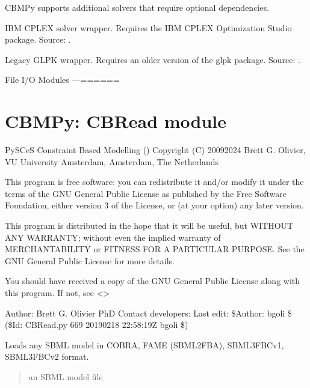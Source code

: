 \documentclass[letterpaper,12pt,english]{sphinxmanual}
\begin{document}
\sphinxAtStartPar
CBMPy supports additional solvers that require optional dependencies.

\sphinxAtStartPar
{} \sphinxhyphen{} IBM CPLEX solver wrapper. Requires the IBM CPLEX Optimization Studio package. Source: .

\sphinxAtStartPar
{} \sphinxhyphen{} Legacy GLPK wrapper. Requires an older version of the glpk package. Source: .

\sphinxstepscope

\sphinxAtStartPar
File I/O Modules
—=\sphinxhyphen{}=\textendash{}=\sphinxhyphen{}=\textendash{}=\sphinxhyphen{}=


\section{CBMPy: CBRead module}
\label{\detokenize{api/io:cbmpy-cbread-module}}\label{\detokenize{api/io::doc}}
\sphinxAtStartPar
PySCeS Constraint Based Modelling ()
Copyright (C) 2009\sphinxhyphen{}2024 Brett G. Olivier, VU University Amsterdam, Amsterdam, The Netherlands

\sphinxAtStartPar
This program is free software: you can redistribute it and/or modify
it under the terms of the GNU General Public License as published by
the Free Software Foundation, either version 3 of the License, or
(at your option) any later version.

\sphinxAtStartPar
This program is distributed in the hope that it will be useful,
but WITHOUT ANY WARRANTY; without even the implied warranty of
MERCHANTABILITY or FITNESS FOR A PARTICULAR PURPOSE.  See the
GNU General Public License for more details.

\sphinxAtStartPar
You should have received a copy of the GNU General Public License
along with this program.  If not, see \textless{}\textgreater{}

\sphinxAtStartPar
Author: Brett G. Olivier PhD
Contact developers: 
Last edit: \$Author: bgoli \$ (\$Id: CBRead.py 669 2019\sphinxhyphen{}02\sphinxhyphen{}18 22:58:19Z bgoli \$)


\begin{fulllineitems}

\pysigstartsignatures
\pysiglinewithargsret
{}
{}
{}
\pysigstopsignatures
\sphinxAtStartPar
Loads any SBML model in COBRA, FAME (SBML2FBA), SBML3FBCv1, SBML3FBCv2 format.
\begin{quote}\begin{description}
\sphinxAtStartPar
{} \textendash{} an SBML model file

\end{description}\end{quote}

\end{fulllineitems}
\end{document}

